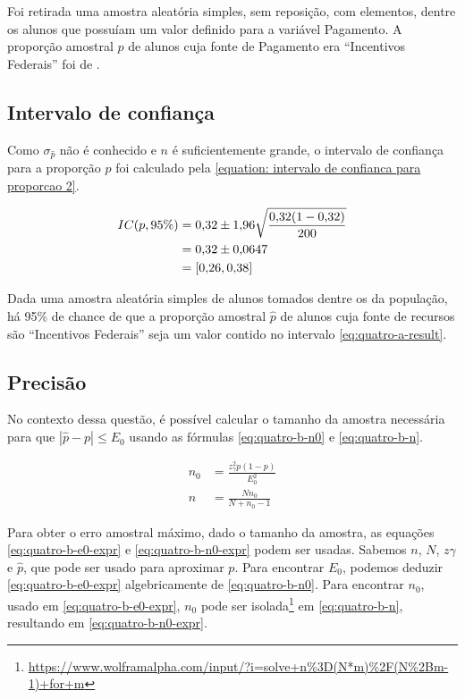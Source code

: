 

	Foi retirada uma amostra aleatória simples, sem reposição, com \QUATROn
	elementos, dentre os \QUATRON alunos que possuíam um valor definido para a
	variável Pagamento. A proporção amostral $\hat{p}$ de alunos cuja fonte de
	Pagamento era ``Incentivos Federais'' foi de \QUATROpAmostral.

\subsection{Intervalo de confiança}

	Como $\sigma_{\hat{p}}$ não é conhecido e $n$ é suficientemente grande,
	o intervalo de confiança para a proporção $p$ foi calculado pela
	\autoref{equation: intervalo de confianca para proporcao 2}.

	\begin{align} 
		IC(p, 95\%) &= \num{0.32} \pm \num{1.96} \sqrt{\frac{\num{0.32} (1- \num{0.32})}{200}} \nonumber \\
					&= \num{0.32} \pm \num{0.0647} \nonumber \\
					\label{eq:quatro-a-result}
					&= [\num{0.26}, \num{0.38}]
	\end{align}

	Dada uma amostra aleatória simples de \QUATROn alunos tomados dentre os
	\QUATRON da população, há 95\% de chance de que a proporção amostral $\hat{p}$ 
    de alunos cuja fonte de recursos são ``Incentivos Federais'' seja um valor 
    contido no intervalo \eqref{eq:quatro-a-result}.

\subsection{Precisão}

	No contexto dessa questão, é possível calcular o tamanho da amostra
	necessária para que $|\hat{p} - p| \leq E_0$ usando as fórmulas
	\eqref{eq:quatro-b-n0} e \eqref{eq:quatro-b-n}.

	\begin{align}
		n_0 &= \label{eq:quatro-b-n0}
			   \frac{z_\gamma^2 p(1-p)}{E_0^2} \\
		n &= \label{eq:quatro-b-n}
			 \frac{N n_0}{N + n_0 - 1} 
	\end{align}

	Para obter o erro amostral máximo, dado o tamanho da amostra, as
	equações \eqref{eq:quatro-b-e0-expr} e \eqref{eq:quatro-b-n0-expr} podem
	ser usadas. Sabemos $n$, $N$, $z\gamma$ e $\hat{p}$, que pode ser usado para
	aproximar $p$. Para encontrar $E_0$, podemos deduzir
	\eqref{eq:quatro-b-e0-expr} algebricamente de \eqref{eq:quatro-b-n0}.
	Para encontrar $n_0$, usado em \eqref{eq:quatro-b-e0-expr}, $n_0$ pode
	ser isolada\footnote{\url{https://www.wolframalpha.com/input/?i=solve+n\%3D(N*m)\%2F(N\%2Bm-1)+for+m}}
    em \eqref{eq:quatro-b-n}, resultando em
	\eqref{eq:quatro-b-n0-expr}. 

